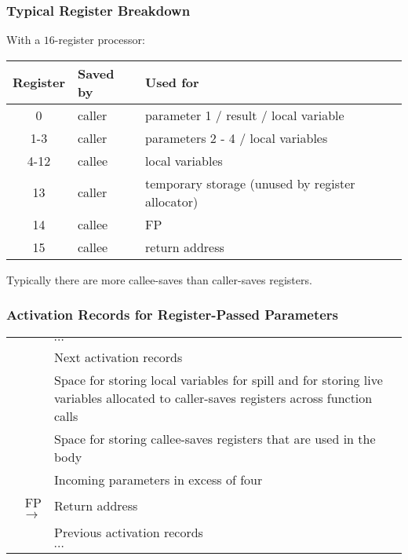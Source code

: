 \documentclass{beamer}
\begin{document}
\begin{frame}
\frametitle{Typical Register Breakdown}

With a $16$-register processor:

\renewcommand{\arraystretch}{0.9}

\begin{center}
\begin{tabular}{|c|l|l|}\hline
Register & Saved by & Used for \\\hline
0 & caller & parameter 1 / result / local variable\\
1-3 & caller & parameters 2 - 4 / local variables \\
4-12 & callee & local variables \\
13 & caller & temporary storage (unused by register allocator) \\
14 & callee & FP \\
15 & callee & return address \\\hline
\end{tabular}
\end{center}

Typically there are more callee-saves than caller-saves registers.


\end{frame}


\begin{frame}
\frametitle{Activation Records for Register-Passed Parameters}

\renewcommand{\arraystretch}{0.9}

\begin{center}
\begin{tabular}{r|p{17em}|}

& $\cdots$ \\

& Next activation records \\\hline

 & Space for storing local variables for spill and for storing
live variables allocated to caller-saves registers across function
calls \\\cline{2-2}

 & Space for storing callee-saves registers that are used in the body
\\\cline{2-2}

 & Incoming parameters in excess of four \\\cline{2-2}

FP $\longrightarrow$ & Return address \\\hline & Previous activation
records \\ & $\cdots$
\end{tabular}
\end{center}

\end{frame}
\end{document}
